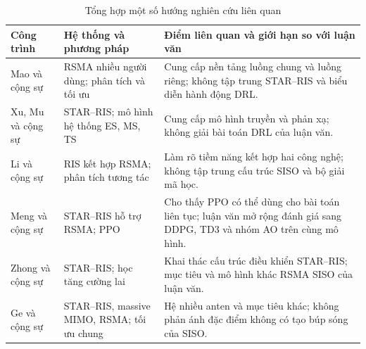 \begin{table}[htbp]
\centering
\caption{Tổng hợp một số hướng nghiên cứu liên quan}
\label{tab:ch1-nghien-cuu}
\footnotesize
\begin{tabularx}{\textwidth}{@{}l l Y@{}}
\toprule
\textbf{Công trình} & \textbf{Hệ thống và phương pháp} & \textbf{Điểm liên quan và giới hạn so với luận văn} \\
\midrule
Mao và cộng sự \cite{Mao2018RSMABridging, Mao2022RSMAFundamentals}
& RSMA nhiều người dùng; phân tích và tối ưu
& Cung cấp nền tảng luồng chung và luồng riêng; không tập trung STAR--RIS và biểu diễn hành động DRL. \\
\addlinespace
Xu, Mu và cộng sự \cite{Xu2021STARRIS, Mu2021STARAided}
& STAR--RIS; mô hình hệ thống ES, MS, TS
& Cung cấp mô hình truyền và phản xạ; không giải bài toán DRL của luận văn. \\
\addlinespace
Li và cộng sự \cite{Li2022RSMARISInterplay}
& RIS kết hợp RSMA; phân tích tương tác
& Làm rõ tiềm năng kết hợp hai công nghệ; không tập trung cấu trúc SISO và bộ giải mã học. \\
\addlinespace
Meng và cộng sự \cite{Meng2024PPOSTARRSMA}
& STAR--RIS hỗ trợ RSMA; PPO
& Cho thấy PPO có thể dùng cho bài toán liên tục; luận văn mở rộng đánh giá sang DDPG, TD3 và nhóm AO trên cùng mô hình. \\
\addlinespace
Zhong và cộng sự \cite{Zhong2022HybridRLSTAR}
& STAR--RIS; học tăng cường lai
& Khai thác cấu trúc điều khiển STAR--RIS; mục tiêu và mô hình khác RSMA SISO của luận văn. \\
\addlinespace
Ge và cộng sự \cite{Ge2024RSMAMassiveMIMO}
& STAR--RIS, massive MIMO, RSMA; tối ưu chung
& Hệ nhiều anten và mục tiêu khác; không phản ánh đặc điểm không có tạo búp sóng của SISO. \\
\bottomrule
\end{tabularx}
\end{table}

